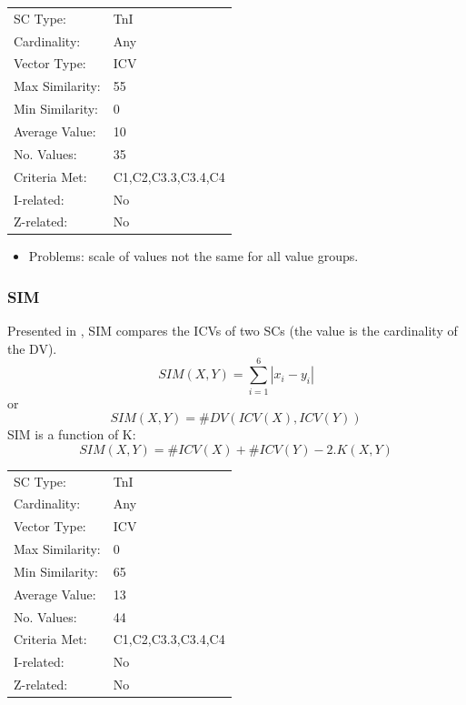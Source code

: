 \documentclass{article}
\begin{document}
\begin{center}
\begin{tabular}{ll}
 SC Type:         &  TnI                 \\
 Cardinality:     &  Any                 \\
 Vector Type:     &  ICV                 \\
 Max Similarity:  &  55                  \\
 Min Similarity:  &  0                   \\
 Average Value:   &  10                  \\
 No. Values:      &  35                  \\
 Criteria Met:    &  C1,C2,C3.3,C3.4,C4  \\
 I-related:       &  No                  \\
 Z-related:       &  No                  \\
\end{tabular}
\end{center}


\begin{itemize}
\item Problems: scale of values not the same for all value groups.
\end{itemize}
\subsubsection{SIM}
\label{sec-15-1-2}

Presented in \citet[pp. 446]{Morris1979}, SIM compares the ICVs of
two SCs (the value is the cardinality of the DV).
$$SIM\left(X,Y\right)=\sum_{i=1}^{6}\left|x_{i}-y_{i}\right|$$
or
$$SIM\left(X,Y\right)=\#DV\left(ICV\left(X\right),ICV\left(Y\right)\right)$$
SIM is a function of K:
$$SIM(X,Y) = \#ICV(X) + \#ICV(Y) - 2.K(X,Y)$$

\begin{center}
\begin{tabular}{ll}
 SC Type:         &  TnI                 \\
 Cardinality:     &  Any                 \\
 Vector Type:     &  ICV                 \\
 Max Similarity:  &  0                   \\
 Min Similarity:  &  65                  \\
 Average Value:   &  13                  \\
 No. Values:      &  44                  \\
 Criteria Met:    &  C1,C2,C3.3,C3.4,C4  \\
 I-related:       &  No                  \\
 Z-related:       &  No                  \\
\end{tabular}
\end{center}
\end{document}
